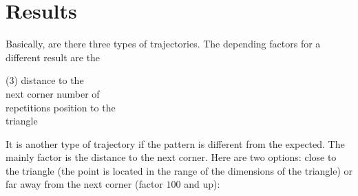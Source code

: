\documentclass[11pt,a4paper]{article}
\begin{document}
\section{Results}
Basically, are there three types of trajectories. The depending factors for a different result are the
\begin{tasks}(3)
\task distance to the \\next corner
\task number of \\repetitions
\task position to the \\triangle
\end{tasks}
It is another type of trajectory if the pattern is different from the expected. The mainly factor is the distance to the next corner. Here are two options: close to the triangle (the point is located in the range of the dimensions of the triangle) or far away from the next corner (factor \(100\) and up):
\end{document}
